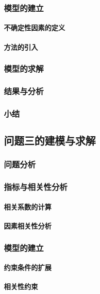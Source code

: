 \documentclass[withoutpreface]{cumcmthesis}
\begin{document}
\subsubsection{模型的建立}
\paragraph{不确定性因素的定义}
\paragraph{方法的引入}
\subsubsection{模型的求解}
\subsubsection{结果与分析}
\subsubsection{小结}

\subsection{问题三的建模与求解}
\subsubsection{问题分析}
\subsubsection{指标与相关性分析}
\paragraph{相关系数的计算}
\paragraph{因素相关性分析}
\subsubsection{模型的建立}
\paragraph{约束条件的扩展}
\paragraph{相关性约束}
\end{document}
